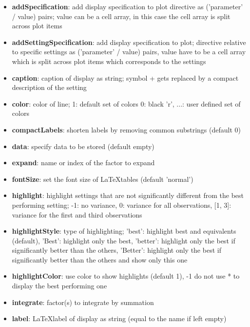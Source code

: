 \documentclass[a4paper,fleqn]{tufte-handout}
\begin{document}
\begin{itemize}
\item \textbf{addSpecification}: add display specification to plot directive
    	as ('parameter' / value) pairs;
           value can be a cell array, in this case the cell array is split
           across plot items                 
\item \textbf{addSettingSpecification}:  add display specification to plot;
           directive relative to specific settings as ('parameter' / value) pairs,
           value have to be a cell array which is split
           across plot items which corresponds to the settings                
\item \textbf{caption}: caption of display as string;
    	symbol + gets replaced by a compact description of the setting  
\item \textbf{color}: color of line;
           1: default set of colors
           0: black
           {'r', ...}: user defined set of colors                 
\item \textbf{compactLabels}: shorten labels by removing common substrings
           (default 0)                 
\item \textbf{data}: specify data to be stored (default empty)  
\item \textbf{expand}: name or index of the factor to expand                 
\item \textbf{fontSize}:  set the font size of \LaTeX tables (default 'normal')                
\item \textbf{highlight}:  highlight settings that are not significantly
    	different from the best performing setting;
       -1: no variance,
    	0: variance for all observations,
    	[1, 3]: variance for the first and third observations 
\item \textbf{highlightStyle}:  type of highlighting;
        'best': highlight best and equivalents (default),
        'Best': highlight only the best,
        'better': highlight only the best if significantly better than
           the others,
        'Better': highlight only the best if significantly better than
           the others and show only this one                
\item \textbf{highlightColor}: use color to show highlights (default 1), -1 do
       not use * to display the best performing one                 
\item \textbf{integrate}:  factor(s) to integrate by summation 
\item \textbf{label}: \LaTeX label of display as string (equal to the name if left empty)             

\end{itemize}
\end{document}
